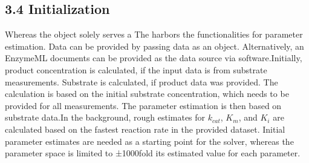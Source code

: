 \documentclass[letterpaper,10pt,english]{jupyterBook}
\begin{document}
\subsection{3.4 Initialization}
\label{\detokenize{methods:initialization}}
\sphinxAtStartPar
Whereas the  object solely serves a
The  harbors the functionalities for parameter estimation. Data can be provided by passing data as an  object. Alternatively, an EnzymeML documents can be provided as the data source via  software.Initially, product concentration is calculated, if the input data is from substrate measurements. Substrate is calculated, if product data was provided. The calculation is based on the initial substrate concentration, which needs to be provided for all measurements. The parameter estimation is then based on substrate data.In the background, rough estimates for \(k_{cat}\), \(K_{m}\), and \(K_{i}\) are calculated based on the fastest reaction rate in the provided dataset. Initial parameter estimates are needed as a starting point for the solver, whereas the parameter space is limited to ±1000\sphinxhyphen{}fold its estimated value for each parameter.
\end{document}
